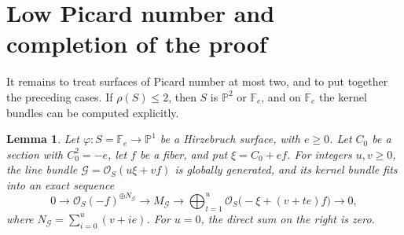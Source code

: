 \documentclass[11pt,reqno]{amsart}
\numberwithin{equation}{section}
\newtheorem{lemma}[lemma]{Lemma}
\theoremstyle{remark}
\newcommand{\sshf}[1]{\mathcal{O}_{#1}}
\newcommand{\shf}[1]{\mathscr{#1}}
\newcommand{\prj}[1]{\mathbb{P}^{#1}}
\begin{document}
\section{Low Picard number and completion of the proof}\label{sec:completion}

It remains to treat surfaces of Picard number at most two, and to put together the preceding cases. If \(\rho(S)\leq2\), then \(S\) is \(\prj{2}\) or \(\mathbb F_e\), and on \(\mathbb F_e\) the kernel bundles can be computed explicitly.

\begin{lemma}
\label{lem:hirzebruch-kernel}
Let \(\varphi\colon S=\mathbb F_e\to\prj{1}\) be a Hirzebruch surface, with \(e\geq0\). Let \(C_0\) be a section with \(C_0^2=-e\), let \(f\) be a fiber, and put \(\xi=C_0+ef\). For integers \(u,v\geq0\), the line bundle \(\shf{G}=\sshf{S}(u\xi+vf)\) is globally generated, and its kernel bundle fits into an exact sequence
\begin{equation}\label{eq:Fe-evaluation}
 0\longrightarrow
 \sshf{S}(-f)^{\oplus N_{\shf{G}}}
 \longrightarrow M_{\shf{G}}
 \longrightarrow
 \bigoplus_{t=1}^u
 \sshf{S}\bigl(-\xi+(v+te)f\bigr)
 \longrightarrow0,
\end{equation}
where \(N_{\shf{G}}=\sum_{i=0}^u(v+ie)\). For \(u=0\), the direct sum on the right is zero.
\end{lemma}
\end{document}
